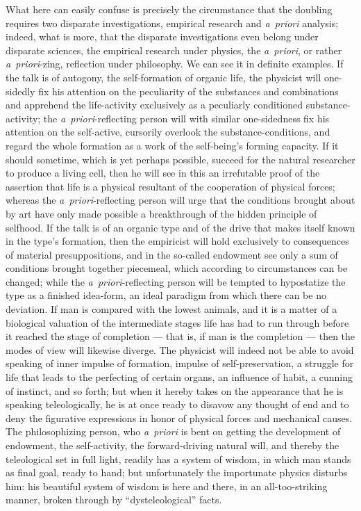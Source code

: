 \documentclass[12pt]{book}
\begin{document}
What here can easily confuse is precisely the circumstance that the doubling requires two
disparate investigations, empirical research and \textit{a~priori} analysis; indeed, what is
more, that the disparate investigations even belong under disparate sciences, the empirical
research under physics, the \textit{a~priori}, or rather \textit{a~priori}-zing, reflection
under philosophy. We can see it in definite examples. If the talk is of autogony, the
self-formation of organic life, the physicist will one-sidedly fix his attention on the
peculiarity of the substances and combinations and apprehend the life-activity exclusively as
a peculiarly conditioned substance-activity; the \textit{a~priori}-reflecting person will with
similar one-sidedness fix his attention on the self-active, cursorily overlook the
substance-conditions, and regard the whole formation as a work of the self-being's forming
capacity. If it should sometime, which is yet perhaps possible, succeed for the natural
researcher to produce a living cell, then he will see in this an irrefutable proof of the
assertion that life is a physical resultant of the cooperation of physical forces; whereas
the \textit{a~priori}-reflecting person will urge that the conditions brought about by art
have only made possible a breakthrough of the hidden principle of selfhood. If the talk is of
an organic type and of the drive that makes itself known in the type's formation, then the
empiricist will hold exclusively to consequences of material presuppositions, and in the
so-called endowment see only a sum of conditions brought together piecemeal, which according
to circumstances can be changed; while the \textit{a~priori}-reflecting person will be tempted
to hypostatize the type as a finished idea-form, an ideal paradigm from which there can be no
deviation. If man is compared with the lowest animals, and it is a matter of a biological
valuation of the intermediate stages life has had to run through before it reached the stage
of completion --- that is, if man is the completion --- then the modes of view will likewise
diverge. The physicist will indeed not be able to avoid speaking of inner impulse of
formation, impulse of self-preservation, a struggle for life that leads to the perfecting of
certain organs, an influence of habit, a cunning of instinct, and so forth; but when it
hereby takes on the appearance that he is speaking teleologically, he is at once ready to
disavow any thought of end and to deny the figurative expressions in honor of physical forces
and mechanical causes. The philosophizing person, who \textit{a~priori} is bent on getting the
development of endowment, the self-activity, the forward-driving natural will, and thereby the
teleological set in full light, readily has a system of wisdom, in which man stands as final
goal, ready to hand; but unfortunately the importunate physics disturbs him: his beautiful
system of wisdom is here and there, in an all-too-striking manner, broken through by
``dysteleological'' facts.
\end{document}
